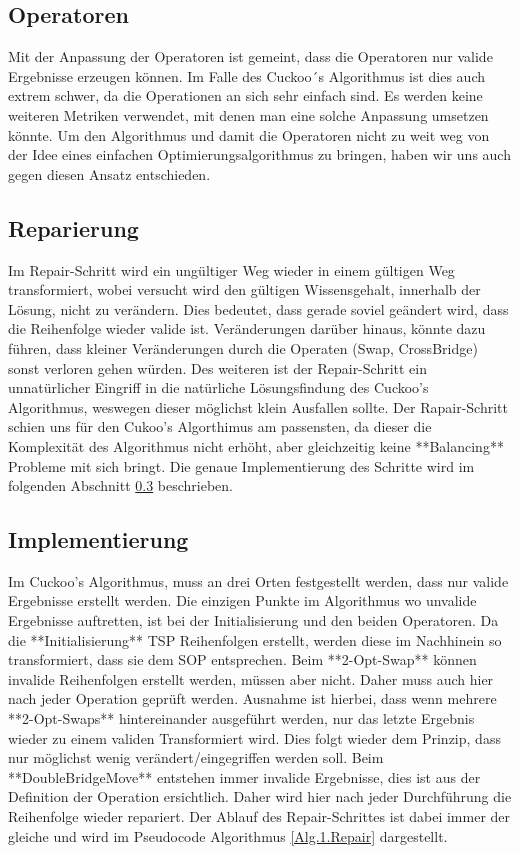 \documentclass[conference]{IEEEtran}
\begin{document}
    \subsection{Operatoren}
      Mit der Anpassung der Operatoren ist gemeint, dass die Operatoren nur valide Ergebnisse erzeugen 
      können. Im Falle des Cuckoo´s Algorithmus ist dies auch extrem schwer, da die Operationen 
      an sich sehr einfach sind. Es werden keine weiteren Metriken verwendet, mit denen man eine 
      solche Anpassung umsetzen könnte. Um den Algorithmus und damit die Operatoren nicht zu weit
      weg von der Idee eines einfachen Optimierungsalgorithmus zu bringen, haben wir uns auch 
      gegen diesen Ansatz entschieden.

    \subsection{Reparierung}
      Im Repair-Schritt wird ein ungültiger Weg wieder in einem gültigen Weg transformiert, wobei 
      versucht wird den gültigen Wissensgehalt, innerhalb der Lösung, nicht zu verändern. Dies bedeutet, 
      dass gerade soviel geändert wird, dass die Reihenfolge wieder valide ist. Veränderungen darüber hinaus, 
      könnte dazu führen, dass kleiner Veränderungen durch die Operaten (Swap, CrossBridge) sonst verloren gehen würden.
      Des weiteren ist der Repair-Schritt ein unnatürlicher Eingriff in die natürliche Lösungsfindung des Cuckoo's Algorithmus, 
      weswegen dieser möglichst klein Ausfallen sollte.
      Der Rapair-Schritt schien uns für den Cukoo's Algorthimus am passensten, da dieser die Komplexität des Algorithmus nicht erhöht, 
      aber gleichzeitig keine **Balancing** Probleme mit sich bringt. Die genaue Implementierung des Schritte wird im folgenden 
      Abschnitt \ref{Implementierung Repair} beschrieben.

    \subsection{Implementierung} \label{Implementierung Repair}
      Im Cuckoo's Algorithmus, muss an drei Orten festgestellt werden, dass nur valide Ergebnisse erstellt werden. Die einzigen Punkte im 
      Algorithmus wo unvalide Ergebnisse auftretten, ist bei der Initialisierung und den beiden Operatoren. 
      Da die **Initialisierung** TSP Reihenfolgen erstellt, werden diese im Nachhinein so transformiert, dass sie dem SOP entsprechen. 
      Beim **2-Opt-Swap** können invalide Reihenfolgen erstellt werden, müssen aber nicht. Daher muss auch hier nach jeder Operation geprüft werden. 
      Ausnahme ist hierbei, dass wenn mehrere **2-Opt-Swaps** hintereinander ausgeführt werden, nur das letzte Ergebnis wieder zu einem validen Transformiert wird. 
      Dies folgt wieder dem Prinzip, dass nur möglichst wenig verändert/eingegriffen werden soll. 
      Beim **DoubleBridgeMove** entstehen immer invalide Ergebnisse, dies ist aus der Definition der Operation ersichtlich. 
      Daher wird hier nach jeder Durchführung die Reihenfolge wieder repariert. 
      Der Ablauf des Repair-Schrittes ist dabei immer der gleiche und wird im Pseudocode Algorithmus \ref{Alg.1.Repair} dargestellt.
\end{document}
